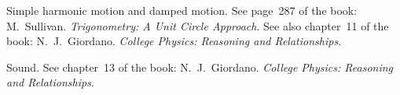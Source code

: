\documentclass[a4paper,oneside,12pt]{article}
\begin{document}
\begin{problem}
\item Simple harmonic motion and damped motion.  See page~287 of the
  book: M.~Sullivan.  \emph{Trigonometry: A Unit Circle Approach}.
  See also chapter~11 of the book:  N.~J.~Giordano.
  \emph{College Physics: Reasoning and Relationships}.

\item Sound.  See chapter~13 of the book:  N.~J.~Giordano.
  \emph{College Physics: Reasoning and Relationships}.
\end{problem}
\end{document}
